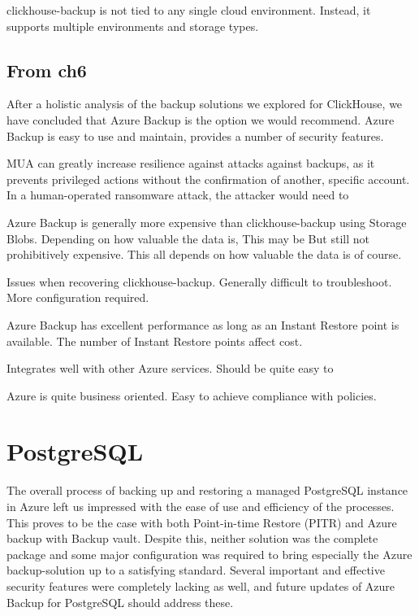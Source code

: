 clickhouse-backup is not tied to any single cloud environment.
Instead, it supports multiple environments and storage types.

\subsection{From ch6}
After a holistic analysis of the backup solutions we explored for ClickHouse,
we have concluded that Azure Backup is the option we would recommend.
Azure Backup is easy to use and maintain,
provides a number of security features.

MUA can greatly increase resilience against attacks against backups,
as it prevents privileged actions without the confirmation of another, specific account.
In a human-operated ransomware attack, 
the attacker would need to 

Azure Backup is generally more expensive than clickhouse-backup using Storage Blobs.
Depending on how valuable the data is, 
This may be 
But still not prohibitively expensive.
This all depends on how valuable the data is of course.

Issues when recovering clickhouse-backup.
Generally difficult to troubleshoot.
More configuration required.

Azure Backup has excellent performance as long as an Instant Restore point is available.
The number of Instant Restore points affect cost.


Integrates well with other Azure services.
Should be quite easy to 

Azure is quite business oriented.
Easy to achieve compliance with policies.





\section{PostgreSQL}
The overall process of backing up and restoring a managed PostgreSQL instance in Azure left us impressed with the ease of use and efficiency of the processes. This proves to be the case with both Point-in-time Restore (PITR) and Azure backup with Backup vault. Despite this, neither solution was the complete package and some major configuration was required to bring especially the Azure backup-solution up to a satisfying standard. Several important and effective security features were completely lacking as well, and future updates of Azure Backup for PostgreSQL should address these. 

